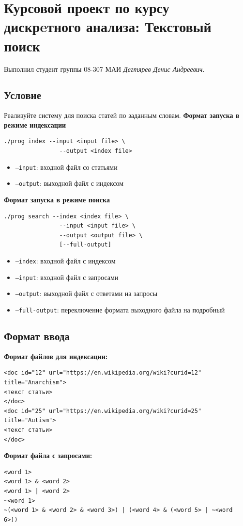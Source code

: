 \documentclass[12pt]{article}
\begin{document}
\section*{Курсовой проект по курсу дискрeтного анализа: Текстовый поиск}

Выполнил студент группы 08-307 МАИ \textit{Дегтярев Денис Андреевич}.

\subsection*{Условие}

Реализуйте систему для поиска статей по заданным словам.  
\textbf{Формат запуска в режиме индексации}
\begin{verbatim}
./prog index --input <input file> \
                --output <index file>
\end{verbatim}

\begin{itemize}
    \item \texttt{--input}: входной файл со статьями
    \item \texttt{--output}: выходной файл с индексом
\end{itemize}

\textbf{Формат запуска в режиме поиска}
\begin{verbatim}
./prog search --index <index file> \
                --input <input file> \
                --output <output file> \
                [--full-output]
\end{verbatim}

\begin{itemize}
    \item \texttt{--index}: входной файл с индексом
    \item \texttt{--input}: входной файл с запросами
    \item \texttt{--output}: выходной файл с ответами на запросы
    \item \texttt{--full-output}: переключение формата выходного файла на подробный
\end{itemize}

\subsection*{Формат ввода}

\textbf{Формат файлов для индексации:}
\begin{verbatim}
<doc id="12" url="https://en.wikipedia.org/wiki?curid=12" title="Anarchism">
<текст статьи>
</doc>
<doc id="25" url="https://en.wikipedia.org/wiki?curid=25" title="Autism">
<текст статьи>
</doc>
\end{verbatim}
\textbf{Формат файла с запросами:}
\begin{verbatim}
<word 1>
<word 1> & <word 2>
<word 1> | <word 2>
~<word 1>
~(<word 1> & <word 2> & <word 3>) | (<word 4> & (<word 5> | ~<word 6>))
\end{verbatim}
\end{document}
